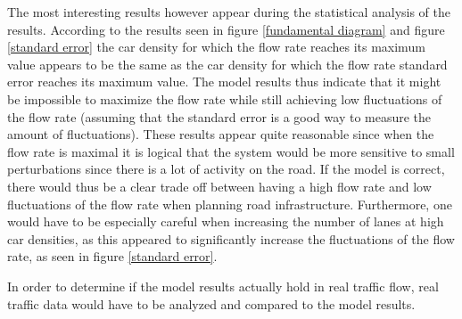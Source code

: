 \documentclass[a4paper,12pt]{article}
\begin{document}
The most interesting results however appear during the statistical analysis of the results.
According to the results seen in figure \ref*{fundamental diagram} and figure \ref*{standard error} the car density for which the flow rate reaches its maximum value appears
to be the same as the car density for which the flow rate standard error reaches its maximum value. The model results thus indicate that it might be impossible to maximize the flow rate while still
achieving low fluctuations of the flow rate (assuming that the standard error is a good way to measure the amount of fluctuations). These results appear quite reasonable since when the flow rate is maximal it is logical that the system would be more sensitive
to small perturbations since there is a lot of activity on the road. If the model is correct, there would thus be a clear trade off between having a high flow rate and
low fluctuations of the flow rate when planning road infrastructure.
Furthermore, one would have to be especially careful when increasing the number of lanes at high car densities, 
as this appeared to significantly increase the fluctuations of the flow rate, as seen in figure \ref*{standard error}.

In order to determine if the model results actually hold in real traffic flow, real traffic data would have to be analyzed and compared to the model results.
\end{document}
